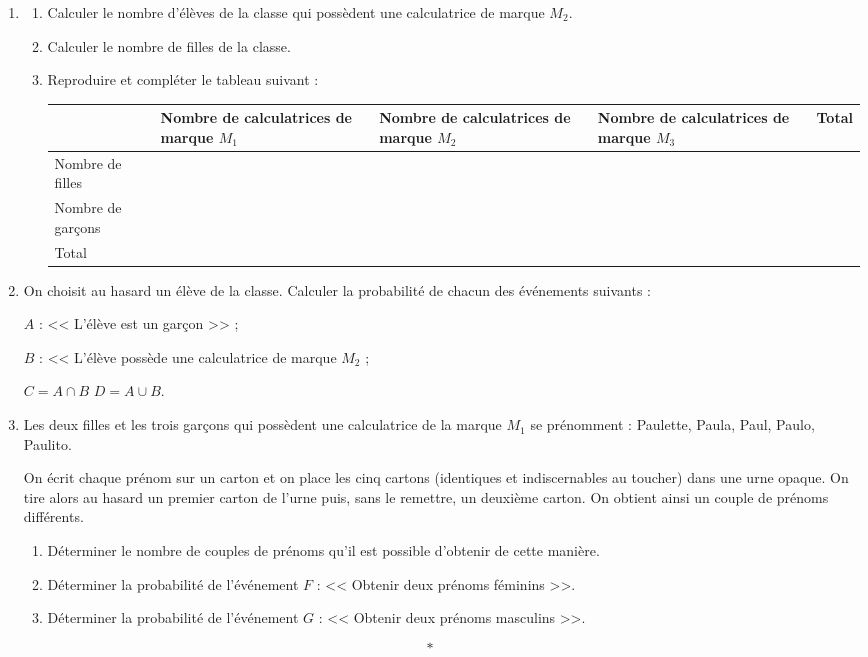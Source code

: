 \documentclass[10pt,french]{book}
\begin{document}
\begin{enumerate}
    \item \begin{enumerate}
                \item Calculer le nombre d'élèves de la classe qui possèdent une calculatrice de marque $M_2$.
                \item Calculer le nombre de filles de la classe.
                \item Reproduire et compléter le tableau suivant :
                \begin{center}
                    \begin{tabular}{*{5}{|>{\centering\arraybackslash}m{2.25cm}}|}
                        \hline
                            & Nombre de calculatrices de marque $M_1$ & Nombre de calculatrices de marque $M_2$ & Nombre de calculatrices de marque $M_3$ & Total \\
                        \hline
                            Nombre de filles & & & & \\
                        \hline
                            Nombre de garçons & & & & \\
                        \hline
                            Total & & & & \\
                        \hline
                    \end{tabular}
                \end{center}
            \end{enumerate}
    \item On choisit au hasard un élève de la classe. Calculer la probabilité de chacun des événements suivants :\par
        $A$ : << L'élève est un garçon >> ; \par $B$ : << L'élève possède une calculatrice de marque $M_2$ ;\par
        $C = A \cap B$ \qq $D = A \cup B$.
    \item Les deux filles et les trois garçons qui possèdent une calculatrice de la marque $M_1$ se prénomment : Paulette, Paula, Paul, Paulo, Paulito.\par On écrit chaque prénom sur un carton et on place les cinq cartons (identiques et indiscernables au toucher) dans une urne opaque. On tire alors au hasard un premier carton de l'urne puis, sans le remettre, un deuxième carton. On obtient ainsi un couple de prénoms différents.
        \begin{enumerate}
            \item Déterminer le nombre de couples de prénoms qu'il est possible d'obtenir de cette manière.
            \item Déterminer la probabilité de l'événement $F$ : << Obtenir deux prénoms féminins >>.
            \item Déterminer la probabilité de l'événement $G$ : << Obtenir deux prénoms masculins >>.
        \end{enumerate}
\end{enumerate}\[*\]
\end{document}
